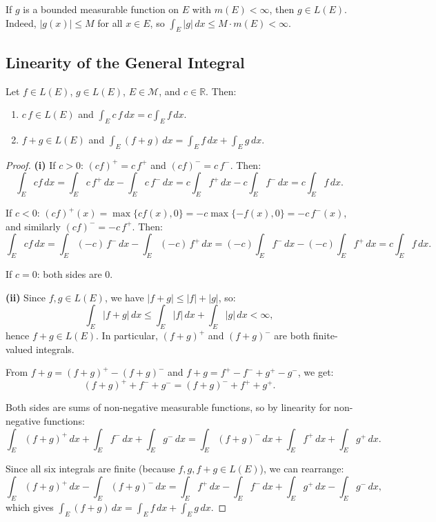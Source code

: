 \documentclass[11pt]{report}
\begin{document}
\begin{exbox}
If $g$ is a bounded measurable function on $E$ with $m(E) < \infty$, then $g \in L(E)$. Indeed, $|g(x)| \leq M$ for all $x \in E$, so $\int_E |g|\,dx \leq M \cdot m(E) < \infty$.
\end{exbox}

\subsection{Linearity of the General Integral}

\begin{thmbox}[Linearity]
Let $f \in L(E)$, $g \in L(E)$, $E \in \mathcal{M}$, and $c \in \mathbb{R}$. Then:
\begin{enumerate}[label=(\roman*)]
\item $c\,f \in L(E)$ and $\displaystyle\int_E c\,f\,dx = c\int_E f\,dx$.
\item $f + g \in L(E)$ and $\displaystyle\int_E (f + g)\,dx = \int_E f\,dx + \int_E g\,dx$.
\end{enumerate}
\end{thmbox}

\begin{proof}
\textbf{(i)} If $c > 0$: $(cf)^+ = c\,f^+$ and $(cf)^- = c\,f^-$. Then:
\[
\int_E cf\,dx = \int_E c\,f^+\,dx - \int_E c\,f^-\,dx = c\int_E f^+\,dx - c\int_E f^-\,dx = c\int_E f\,dx.
\]

If $c < 0$: $(cf)^+(x) = \max\{cf(x), 0\} = -c\max\{-f(x), 0\} = -c\,f^-(x)$, and similarly $(cf)^- = -c\,f^+$. Then:
\[
\int_E cf\,dx = \int_E (-c)\,f^-\,dx - \int_E (-c)\,f^+\,dx = (-c)\int_E f^-\,dx - (-c)\int_E f^+\,dx = c\int_E f\,dx.
\]

If $c = 0$: both sides are $0$.

\textbf{(ii)} Since $f, g \in L(E)$, we have $|f + g| \leq |f| + |g|$, so:
\[
\int_E |f + g|\,dx \leq \int_E |f|\,dx + \int_E |g|\,dx < \infty,
\]
hence $f + g \in L(E)$. In particular, $(f+g)^+$ and $(f+g)^-$ are both finite-valued integrals.

From $f + g = (f+g)^+ - (f+g)^-$ and $f + g = f^+ - f^- + g^+ - g^-$, we get:
\[
(f+g)^+ + f^- + g^- = (f+g)^- + f^+ + g^+.
\]

Both sides are sums of non-negative measurable functions, so by linearity for non-negative functions:
\[
\int_E (f+g)^+\,dx + \int_E f^-\,dx + \int_E g^-\,dx = \int_E (f+g)^-\,dx + \int_E f^+\,dx + \int_E g^+\,dx.
\]

Since all six integrals are finite (because $f, g, f+g \in L(E)$), we can rearrange:
\[
\int_E (f+g)^+\,dx - \int_E (f+g)^-\,dx = \int_E f^+\,dx - \int_E f^-\,dx + \int_E g^+\,dx - \int_E g^-\,dx,
\]
which gives $\int_E (f+g)\,dx = \int_E f\,dx + \int_E g\,dx$.
\end{proof}
\end{document}
